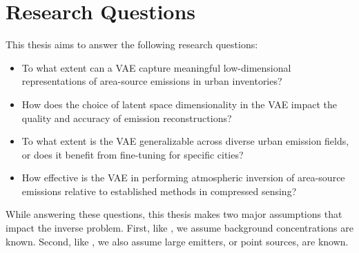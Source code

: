 \section{Research Questions}
This thesis aims to answer the following research questions:

\begin{itemize}
    \item To what extent can a \gls{VAE} capture meaningful low-dimensional representations of area-source emissions in urban inventories?
    \item How does the choice of latent space dimensionality in the \gls{VAE} impact the quality and accuracy of emission reconstructions?
    \item To what extent is the \gls{VAE} generalizable across diverse urban emission fields, or does it benefit from fine-tuning for specific cities?
    \item How effective is the \gls{VAE} in performing atmospheric inversion of area-source emissions relative to established methods in compressed sensing?
\end{itemize}

While answering these questions, this thesis makes two major assumptions that impact the inverse problem.
First, like \textcite{UrbanSparseReconstruction}, we assume background concentrations are known.
Second, like \textcite{JonesInversion}, we also assume large emitters, or point sources, are known.
